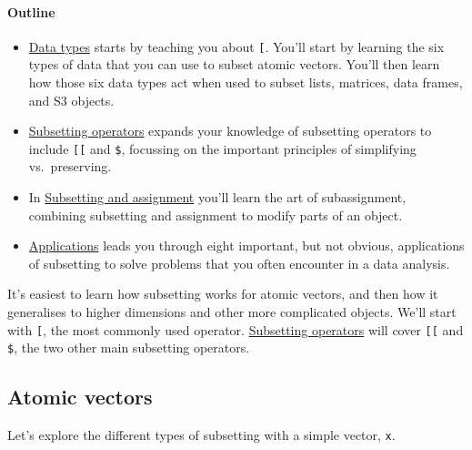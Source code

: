 \paragraph{Outline}

\begin{itemize}
\item
  \hyperref[data-types]{Data types} starts by teaching you about
  \texttt{{[}}. You'll start by learning the six types of data that you
  can use to subset atomic vectors. You'll then learn how those six data
  types act when used to subset lists, matrices, data frames, and S3
  objects.
\item
  \hyperref[subsetting-operators]{Subsetting operators} expands your
  knowledge of subsetting operators to include \texttt{{[}{[}} and
  \texttt{\$}, focussing on the important principles of simplifying
  vs.~preserving.
\item
  In \hyperref[subassignment]{Subsetting and assignment} you'll learn
  the art of subassignment, combining subsetting and assignment to
  modify parts of an object.
\item
  \hyperref[applications]{Applications} leads you through eight
  important, but not obvious, applications of subsetting to solve
  problems that you often encounter in a data analysis.
\end{itemize}


It's easiest to learn how subsetting works for atomic vectors, and then
how it generalises to higher dimensions and other more complicated
objects. We'll start with \texttt{{[}}, the most commonly used operator.
\hyperref[subsetting-operators]{Subsetting operators} will cover
\texttt{{[}{[}} and \texttt{\$}, the two other main subsetting
operators.

\subsection{Atomic vectors}

Let's explore the different types of subsetting with a simple vector,
\texttt{x}. 
 \indexc{[}

\begin{Shaded}
\begin{Highlighting}[]
\StringTok{ }\NormalTok{(}\NormalTok{, }\NormalTok{, }\NormalTok{, }\NormalTok{)}
\end{Highlighting}
\end{Shaded}

